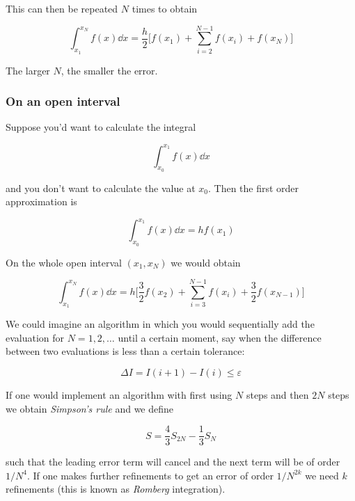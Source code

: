 \documentclass[a4paper]{article}
\begin{document}
This can then be repeated $N$ times to obtain

\begin{equation*}
    \int_{x_1}^{x_N}f(x)\dd{x}=\frac{h}{2}\bigg[f(x_1)+\sum_{i=2}^{N-1}f(x_i)+f(x_N)\bigg]
\end{equation*}

The larger $N$, the smaller the error. 

\subsubsection{On an open interval}

Suppose you'd want to calculate the integral

\begin{equation*}
    \int_{x_0}^{x_1}f(x)\dd{x}
\end{equation*}

and you don't want to calculate the value at $x_0$. Then the first order approximation is

\begin{equation*}
    \int_{x_0}^{x_1}f(x)\dd{x}=hf(x_1)
\end{equation*}

On the whole open interval $(x_1, x_N)$ we would obtain

\begin{equation*}
    \int_{x_1}^{x_N}f(x)\dd{x}=h\bigg[\frac{3}{2}f(x_2)+\sum_{i=3}^{N-1}f(x_i)+\frac{3}{2}f(x_{N-1})\bigg]
\end{equation*}

We could imagine an algorithm in which you would sequentially add the evaluation for $N=1, 2,\dots$ until a certain moment, say when the difference between two evaluations is less than a certain tolerance:

\begin{equation*}
    \Delta I = I(i+1)-I(i)\le\varepsilon
\end{equation*}

If one would implement an algorithm with first using $N$ steps and then $2N$ steps we obtain \textit{Simpson's rule} and we define

\begin{equation*}
    S=\frac{4}{3}S_{2N}-\frac{1}{3}S_N
\end{equation*}

such that the leading error term will cancel and the next term will be of order $1/N^4$. If one makes further refinements to get an error of order $1/N^{2k}$ we need $k$ refinements (this is known as \textit{Romberg} integration).
\end{document}
